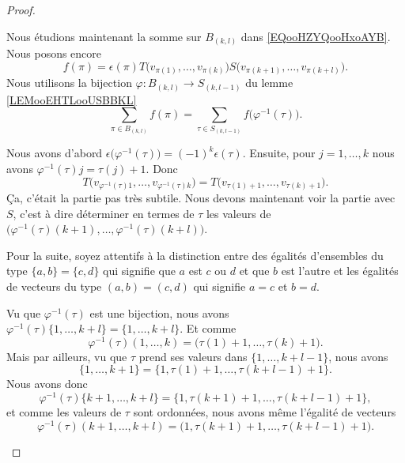 \begin{proof}
\begin{subproof}
		Nous étudions maintenant la somme sur \( B_{(k,l)}\) dans \eqref{EQooHZYQooHxoAYB}. Nous posons encore
		\begin{equation}
			f(\pi)=\epsilon(\pi)T\big( v_{\pi(1)},\ldots, v_{\pi(k)} \big)S\big( v_{\pi(k+1)},\ldots,v_{\pi(k+l)} \big).
		\end{equation}
		Nous utilisons la bijection \(\varphi \colon B_{(k,l)}\to S_{(k,l-1)}  \) du lemme \ref{LEMooEHTLooUSBBKL}
		\begin{equation}
			\sum_{\pi\in B_{(k,l)}}f(\pi)=\sum_{\tau\in S_{(k,l-1)}}f\big( \varphi^{-1}(\tau) \big).
		\end{equation}

		Nous avons d'abord \( \epsilon\big( \varphi^{-1}(\tau) \big)=(-1)^k\epsilon(\tau)\). Ensuite, pour \( j=1,\ldots,k\) nous avons \( \varphi^{-1}(\tau)j=\tau(j)+1\). Donc
		\begin{equation}		\label{EQooRVUBooGsYfNE}
			T\big( v_{\varphi^{-1}(\tau)1},\ldots,v_{\varphi^{-1}(\tau)k} \big)=T\big( v_{\tau(1)+1},\ldots,v_{\tau(k)+1} \big).
		\end{equation}
		Ça, c'était la partie pas très subtile. Nous devons maintenant voir la partie avec \( S\), c'est à dire déterminer en termes de \( \tau\) les valeurs de \( \big( \varphi^{-1}(\tau)(k+1),\ldots,\varphi^{-1}(\tau)(k+l) \big)\).

		Pour la suite, soyez attentifs à la distinction entre des égalités d'ensembles du type \( \{ a,b \}=\{ c,d \}\) qui signifie que \( a\) est \( c\) ou \( d\) et que \( b\) est l'autre et les égalités de vecteurs du type \( (a,b)=(c,d)\) qui signifie \( a=c\) et \( b=d\).

		Vu que \( \varphi^{-1}(\tau)\) est une bijection, nous avons \( \varphi^{-1}(\tau)\{ 1,\ldots,k+l \}=\{ 1,\ldots,k+l \}\). Et comme
		\begin{equation}
			\varphi^{-1}(\tau)(1,\ldots,k)=\big( \tau(1)+1,\ldots,\tau(k)+1 \big).
		\end{equation}
		Mais par ailleurs, vu que \( \tau\) prend ses valeurs dans \( \{ 1,\ldots,k+l-1 \}\), nous avons
		\begin{equation}
			\{ 1,\ldots,k+1 \}=\{ 1,\tau(1)+1,\ldots,\tau(k+l-1)+1 \}.
		\end{equation}
		Nous avons donc
		\begin{equation}
			\varphi^{-1}(\tau)\{ k+1,\ldots,k+l \}=\{ 1,\tau(k+1)+1,\ldots,\tau(k+l-1)+1 \},
		\end{equation}
		et comme les valeurs de  \( \tau \) sont ordonnées, nous avons même l'égalité de vecteurs
		\begin{equation}
			\varphi^{-1}(\tau)(k+1,\ldots,k+l)=\big( 1,\tau(k+1)+1,\ldots,\tau(k+l-1)+1 \big).
		\end{equation}


\end{subproof}
\end{proof}
